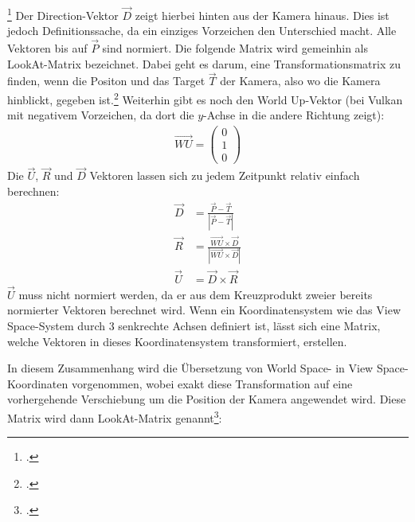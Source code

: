 \documentclass[titlepage, 11pt, a4paper, ngerman]{article}
\begin{document}
\footcitetext{logl-camera}
Der Direction-Vektor $\vec{D}$ zeigt hierbei hinten aus der Kamera hinaus. Dies ist jedoch Definitionssache, da ein einziges Vorzeichen den Unterschied macht. Alle Vektoren bis auf $\vec{P}$ sind normiert. Die folgende Matrix wird gemeinhin als LookAt-Matrix bezeichnet. Dabei geht es darum, eine Transformationsmatrix zu finden, wenn die Positon und das Target $\vec{T}$ der Kamera, also wo die Kamera hinblickt, gegeben ist.\footcite{camera} Weiterhin gibt es noch den World Up-Vektor (bei Vulkan mit negativem Vorzeichen, da dort die $y$-Achse in die andere Richtung zeigt):
\begin{align*}
    \vec{WU} = \begin{pmatrix}
    0 \\
    1 \\
    0
    \end{pmatrix}
\end{align*}
\bigbreak
Die $\vec{U}$, $\vec{R}$ und $\vec{D}$ Vektoren lassen sich zu jedem Zeitpunkt relativ einfach berechnen:
\begin{align*}
    \vec{D} &= \frac{\vec{P} - \vec{T}}{|\vec{P} - \vec{T}|} \\
    \vec{R} &= \frac{\vec{WU} \times \vec{D}}{|\vec{WU} \times \vec{D}|} \\
    \vec{U} &= \vec{D} \times \vec{R}
\end{align*}
\bigbreak
$\vec{U}$ muss nicht normiert werden, da er aus dem Kreuzprodukt zweier bereits normierter Vektoren berechnet wird. Wenn ein Koordinatensystem wie das View Space-System durch 3 senkrechte Achsen definiert ist, lässt sich eine Matrix, welche Vektoren in dieses Koordinatensystem transformiert, erstellen.\par
In diesem Zusammenhang wird die Übersetzung von World Space- in View Space-Koordinaten vorgenommen, wobei exakt diese Transformation auf eine vorhergehende Verschiebung um die Position der Kamera angewendet wird. Diese Matrix wird dann LookAt-Matrix genannt\footcite{camera}:
\end{document}
